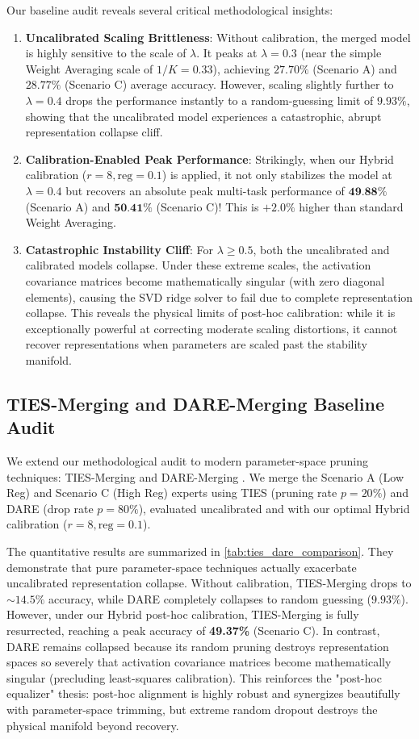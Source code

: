 \documentclass{article}
\theoremstyle{plain}
\theoremstyle{definition}
\theoremstyle{remark}
\begin{document}
Our baseline audit reveals several critical methodological insights:
\begin{enumerate}\itemsep=0pt \parsep=0pt \topsep=0pt
    \item \textbf{Uncalibrated Scaling Brittleness}: Without calibration, the merged model is highly sensitive to the scale of $\lambda$. It peaks at $\lambda = 0.3$ (near the simple Weight Averaging scale of $1/K = 0.33$), achieving $27.70\%$ (Scenario A) and $28.77\%$ (Scenario C) average accuracy. However, scaling slightly further to $\lambda = 0.4$ drops the performance instantly to a random-guessing limit of $9.93\%$, showing that the uncalibrated model experiences a catastrophic, abrupt representation collapse cliff.
    \item \textbf{Calibration-Enabled Peak Performance}: Strikingly, when our Hybrid calibration ($r=8, \text{reg}=0.1$) is applied, it not only stabilizes the model at $\lambda = 0.4$ but recovers an absolute peak multi-task performance of $\textbf{49.88\%}$ (Scenario A) and $\textbf{50.41\%}$ (Scenario C)! This is $+2.0\%$ higher than standard Weight Averaging.
    \item \textbf{Catastrophic Instability Cliff}: For $\lambda \ge 0.5$, both the uncalibrated and calibrated models collapse. Under these extreme scales, the activation covariance matrices become mathematically singular (with zero diagonal elements), causing the SVD ridge solver to fail due to complete representation collapse. This reveals the physical limits of post-hoc calibration: while it is exceptionally powerful at correcting moderate scaling distortions, it cannot recover representations when parameters are scaled past the stability manifold.
\end{enumerate}

\subsection{TIES-Merging and DARE-Merging Baseline Audit}
We extend our methodological audit to modern parameter-space pruning techniques: TIES-Merging \cite{Yadav2023} and DARE-Merging \cite{Yu2023}. We merge the Scenario A (Low Reg) and Scenario C (High Reg) experts using TIES (pruning rate $p=20\%$) and DARE (drop rate $p=80\%$), evaluated uncalibrated and with our optimal Hybrid calibration ($r=8, \text{reg}=0.1$).

The quantitative results are summarized in \cref{tab:ties_dare_comparison}. They demonstrate that pure parameter-space techniques actually exacerbate uncalibrated representation collapse. Without calibration, TIES-Merging drops to $\sim 14.5\%$ accuracy, while DARE completely collapses to random guessing ($9.93\%$). However, under our Hybrid post-hoc calibration, TIES-Merging is fully resurrected, reaching a peak accuracy of \textbf{49.37\%} (Scenario C). In contrast, DARE remains collapsed because its random pruning destroys representation spaces so severely that activation covariance matrices become mathematically singular (precluding least-squares calibration). This reinforces the "post-hoc equalizer" thesis: post-hoc alignment is highly robust and synergizes beautifully with parameter-space trimming, but extreme random dropout destroys the physical manifold beyond recovery.
\end{document}
